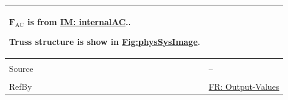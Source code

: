 \documentclass[12pt]{article}
\begin{document}
\begin{minipage}{\textwidth}
\begin{tabular}{>{\raggedright}p{}>{\raggedright\arraybackslash}p{}}
        ${\mathbf{F}_{\text{AC}}}$ is from \hyperref[IM:internalAC]{IM: internalAC}..
        
        Truss structure is show in \hyperref[Figure:physSysImage]{Fig:physSysImage}.
        
\\ \midrule \\
Source & --
         
\\ \midrule \\
RefBy & \hyperref[outputValues]{FR: Output-Values}
        
\\ \bottomrule
\end{tabular}
\end{minipage}

\vspace{\baselineskip}
\noindent
\end{document}
